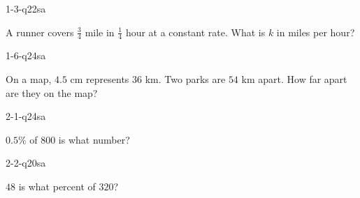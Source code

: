 \documentclass[12pt, fleqn, openany]{studyGuide}
\begin{document}
\renewcommand{\VMBookTitle}{3 Florida FAST Grade 7 Math Practice Tests}
\renewcommand{\VMBookSubtitle}{Full-Length Test Prep with Detailed Answer Explanations}
\renewcommand{\VMFooterURL}{https://viewmath.com/grade7}
\renewcommand{\VMFooterURLDisplay}{ViewMath.com/Grade7}






\tableofcontents
\cleardoublepage
{}


\begin{practiceQuestion}{1-3-q22}{sa}
\begin{questionText}
A runner covers $\frac{3}{4}$ mile in $\frac{1}{4}$ hour at a constant rate. What is $k$ in miles per hour?
\end{questionText}
\end{practiceQuestion}

\begin{practiceQuestion}{1-6-q24}{sa}
\begin{questionText}
On a map, $4.5$ cm represents $36$ km. Two parks are $54$ km apart. How far apart are they on the map?
\end{questionText}
\end{practiceQuestion}

\begin{practiceQuestion}{2-1-q24}{sa}
\begin{questionText}
$0.5\%$ of $800$ is what number?
\end{questionText}
\end{practiceQuestion}

\begin{practiceQuestion}{2-2-q20}{sa}
\begin{questionText}
$48$ is what percent of $320$?
\end{questionText}
\end{practiceQuestion}
\end{document}
